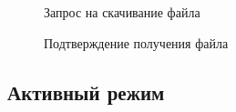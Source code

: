 \documentclass[a4paper, 14pt,russian]{article}
\begin{document}
	\begin{figure}[h!]
		\caption{Запрос на скачивание файла}
		\label{img:ftp_scheme}
	\end{figure}

	\begin{figure}[h!]
		\caption{Подтверждение получения файла}
		\label{img:ftp_scheme}
	\end{figure}
\newpage


\subsection{Активный режим}	
\end{document}
